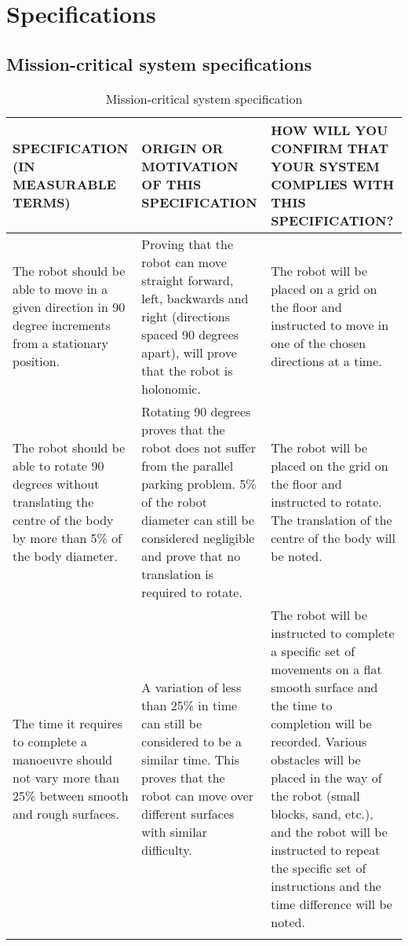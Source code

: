 
\section{Specifications}

\subsection{Mission-critical system specifications}

\begin{center}
\begin{longtable}{|p{5cm}|p{5cm}|p{5cm}|}
\hline
  \textbf{SPECIFICATION (IN MEASURABLE TERMS)} &
  \textbf{ORIGIN OR MOTIVATION OF THIS SPECIFICATION} &
  \textbf{HOW WILL YOU CONFIRM THAT YOUR SYSTEM COMPLIES WITH
           THIS SPECIFICATION?}\\
\hline The robot should be able to move in a given direction in 90 degree increments from a stationary position.
   & Proving that the robot can move straight forward, left, backwards and right (directions spaced 90 degrees apart), will prove that the robot is holonomic.
   &The robot will be placed on a grid on the floor and instructed to move in one of the chosen directions at a time.
   \\
\hline The robot should be able to rotate 90 degrees without translating the centre of the body by more than 5\% of the body diameter.
   & Rotating 90 degrees proves that the robot does not suffer from the parallel parking problem. 5\% of the robot diameter can still be considered negligible and prove that no translation is required to rotate.
   & The robot will be placed on the grid on the floor and instructed to rotate. The translation of the centre of the body will be noted.
   \\
\hline The time it requires to complete a manoeuvre should not vary more than 25\% between smooth and rough surfaces.
   & A variation of less than 25\% in time can still be considered to be a similar time. This proves that the robot can move over different surfaces with similar difficulty.
   &The robot will be instructed to complete a specific set of movements on a flat smooth surface and the time to completion will be recorded. Various obstacles will be placed in the way of the robot (small blocks, sand, etc.), and the robot will be instructed to repeat the specific set of instructions and the time difference will be noted.
   \\
\hline
\caption{Mission-critical system specification}
\end{longtable}
\end{center}


